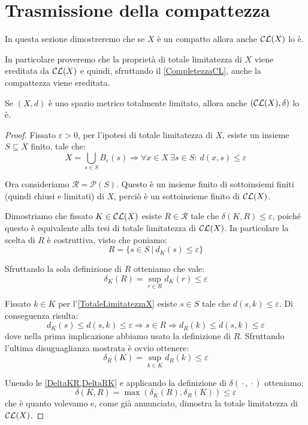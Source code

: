 \section{Trasmissione della compattezza}
In questa sezione dimostreremo che se $X$ è un compatto allora anche $\mathcal{CL}(X)$ lo è. 

In particolare proveremo che la proprietà di totale limitatezza di $X$ viene ereditata da $\mathcal{CL}(X)$ e quindi, sfruttando il \cref{CompletezzaCL}, anche la compattezza viene ereditata.

\begin{lemma}\label{TotaleLimitatezzaCL}
	Se $(X,d)$ è uno spazio metrico totalmente limitato, allora anche $(\mathcal{CL}(X),\delta)$ lo è.
\end{lemma}
\begin{proof}
	Fissato $\varepsilon>0$, per l'ipotesi di totale limitatezza di $X$, esiste un insieme $S\subseteq X$ finito, tale che:
	\begin{equation}\label{TotaleLimitatezzaX}
		X=\bigcup_{s\in S} B_{\varepsilon}(s) \Longrightarrow 
		\forall x\in X\ \exists s\in S:\ d(x,s)\le \varepsilon
	\end{equation}

	Ora consideriamo $\mathcal{R}=\mathcal{P}(S)$. Questo è un insieme finito di sottoinsiemi finiti (quindi chiusi e limitati) di $X$, perciò è un sottoinsieme finito di $\mathcal{CL}(X)$. 
	
	Dimostriamo che fissato $K\in\mathcal{CL}(X)$ esiste $R\in \mathcal{R}$ tale che $\delta(K,R)\le \varepsilon$, poiché questo è equivalente alla tesi di totale limitatezza di $\mathcal{CL}(X)$. In particolare la scelta di $R$ è costruttiva, visto che poniamo:
	\begin{equation*}
		R=\{s\in S\ |\ d_K(s)\le \varepsilon\}
	\end{equation*}
	
	Sfruttando la sola definizione di $R$ otteniamo che vale:
	\begin{equation}\label{DeltaKR}
		\delta_K(R)=\sup_{r\in R} d_K(r) \le \varepsilon
	\end{equation}
	
	Fissato $k\in K$ per l'\cref{TotaleLimitatezzaX} esiste $s\in S$ tale che $d(s,k)\le \varepsilon$. Di conseguenza risulta:
	\begin{equation*}
		d_K(s)\le d(s,k) \le \varepsilon \Longrightarrow s\in R \Longrightarrow d_R(k)\le d(s,k)\le \varepsilon
	\end{equation*}
	dove nella prima implicazione abbiamo usato la definizione di $R$. 
	Sfruttando l'ultima disuguaglianza mostrata è ovvio ottenere:
	\begin{equation}\label{DeltaRK}
		\delta_R(K)=\sup_{k\in K} d_R(k) \le  \varepsilon
	\end{equation}
	
	Unendo le \cref{DeltaKR,DeltaRK} e applicando la definizione di $\delta({}\cdot{},{}\cdot{})$ otteniamo:
	\begin{equation*}
		\delta(K,R)=\max\left(\delta_K(R),\delta_R(K)\right)\le \varepsilon
	\end{equation*}
	che è quanto volevamo e, come già annunciato, dimostra la totale limitatezza di $\mathcal{CL}(X)$.
\end{proof}

